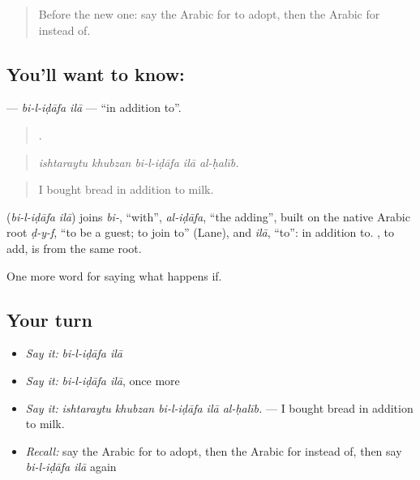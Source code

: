 \label{lesson:AR-C416-bi-l-idafa-ila}



\begin{quote}
Before the new one: say the Arabic for to adopt, then the Arabic for instead of.
\end{quote}

\subsection*{You'll want to know:  }
\textbf{ } — \emph{bi-l-iḍāfa ilā} — \textquotedblleft{}in addition to\textquotedblright{}.

\begin{quote}
    .
\end{quote}

\begin{quote}
\emph{ishtaraytu khubzan bi-l-iḍāfa ilā al-ḥalīb.}
\end{quote}

\begin{quote}
I bought bread in addition to milk.
\end{quote}

\begin{cousinweb}
\textbf{ } (\emph{bi-l-iḍāfa ilā}) joins \emph{bi-}, \textquotedblleft{}with\textquotedblright{}, \emph{al-iḍāfa}, \textquotedblleft{}the adding\textquotedblright{}, built on the native Arabic root \emph{ḍ-y-f}, \textquotedblleft{}to be a guest; to join to\textquotedblright{} (Lane), and \emph{ilā}, \textquotedblleft{}to\textquotedblright{}: in addition to. , to add, is from the same root.
\end{cousinweb}

\begin{grammarlens}[title={What you've built}]
One more word for saying what happens if.
\end{grammarlens}

\subsection*{Your turn}
\begin{itemize}
\raggedright
  \item \emph{Say it:} \emph{bi-l-iḍāfa ilā}
  \item \emph{Say it:} \emph{bi-l-iḍāfa ilā}, once more
  \item \emph{Say it:} \emph{ishtaraytu khubzan bi-l-iḍāfa ilā al-ḥalīb.} — I bought bread in addition to milk.
  \item \emph{Recall:} say the Arabic for to adopt, then the Arabic for instead of, then say \emph{bi-l-iḍāfa ilā} again
\end{itemize}

